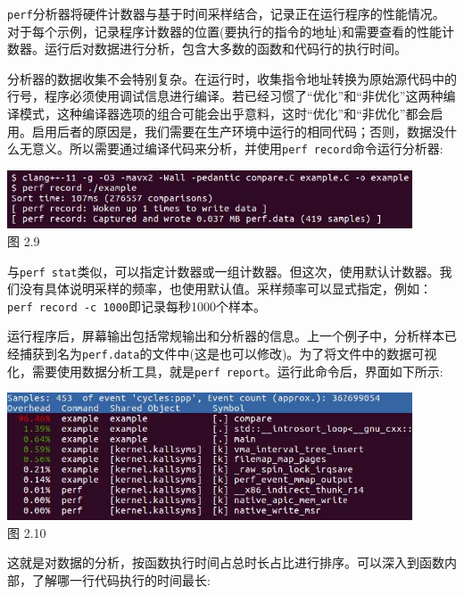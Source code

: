 \texttt{perf}分析器将硬件计数器与基于时间采样结合，记录正在运行程序的性能情况。对于每个示例，记录程序计数器的位置(要执行的指令的地址)和需要查看的性能计数器。运行后对数据进行分析，包含大多数的函数和代码行的执行时间。

分析器的数据收集不会特别复杂。在运行时，收集指令地址转换为原始源代码中的行号，程序必须使用调试信息进行编译。若已经习惯了“优化”和“非优化”这两种编译模式，这种编译器选项的组合可能会出乎意料，这时“优化”和“非优化”都会启用。启用后者的原因是，我们需要在生产环境中运行的相同代码；否则，数据没什么无意义。所以需要通过编译代码来分析，并使用\texttt{perf record}命令运行分析器:

\begin{center}
\includegraphics[width=0.9\textwidth]{content/1/chapter2/images/9.jpg}\\
图 2.9
\end{center}

与\texttt{perf stat}类似，可以指定计数器或一组计数器。但这次，使用默认计数器。我们没有具体说明采样的频率，也使用默认值。采样频率可以显式指定，例如：\texttt{perf record -c 1000}即记录每秒1000个样本。

运行程序后，屏幕输出包括常规输出和分析器的信息。上一个例子中，分析样本已经捕获到名为\texttt{perf.data}的文件中(这是也可以修改)。为了将文件中的数据可视化，需要使用数据分析工具，就是\texttt{perf report}。运行此命令后，界面如下所示:

\begin{center}
\includegraphics[width=0.9\textwidth]{content/1/chapter2/images/10.jpg}\\
图 2.10
\end{center}

这就是对数据的分析，按函数执行时间占总时长占比进行排序。可以深入到函数内部，了解哪一行代码执行的时间最长:

